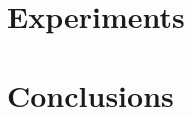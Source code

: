 \documentclass[10pt,twocolumn,letterpaper]{article}
\begin{document}
\section{Experiments}

\section{Conclusions}

{\small


}
\end{document}
